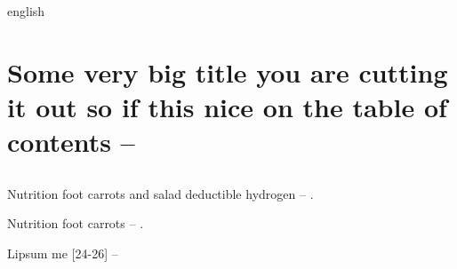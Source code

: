 

\begin{otherlanguage*}{english}

    \chapter
    [Some very big title -- \showfont]
    {Some very big title you are cutting it out so if this nice on the table of contents -- \showfont}

    \begin{flushright}
        \englishword{\showfont}
    \end{flushright}

    \section[Some encoding tests -- \showfont]{\showfont}

    Nutrition foot carrots and salad deductible hydrogen -- \showfont.

    Nutrition foot carrots -- \showfont.

    \englishword{\showfont}

    Lipsum me [24-26] -- \showfont

    \newpage

\end{otherlanguage*}

